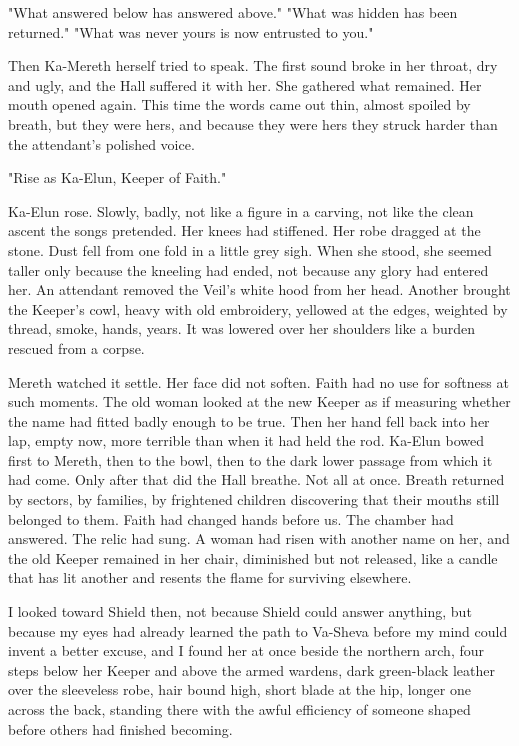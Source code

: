 "What answered below has answered above."
"What was hidden has been returned."
"What was never yours is now entrusted to you."

Then Ka-Mereth herself tried to speak. 
The first sound broke in her throat, dry and ugly, and the Hall suffered it with her. 
She gathered what remained. 
Her mouth opened again. 
This time the words came out thin, almost spoiled by breath, but they were hers, and because they were hers they struck harder than the attendant’s polished voice.

"Rise as Ka-Elun, Keeper of Faith." \par

Ka-Elun rose.
Slowly, badly, not like a figure in a carving, not like the clean ascent the songs pretended. 
Her knees had stiffened. 
Her robe dragged at the stone. 
Dust fell from one fold in a little grey sigh. 
When she stood, she seemed taller only because the kneeling had ended, not because any glory had entered her. 
An attendant removed the Veil’s white hood from her head. 
Another brought the Keeper’s cowl, heavy with old embroidery, yellowed at the edges, weighted by thread, smoke, hands, years. 
It was lowered over her shoulders like a burden rescued from a corpse. \par

Mereth watched it settle.
Her face did not soften. Faith had no use for softness at such moments. 
The old woman looked at the new Keeper as if measuring whether the name had fitted badly enough to be true. 
Then her hand fell back into her lap, empty now, more terrible than when it had held the rod.
Ka-Elun bowed first to Mereth, then to the bowl, then to the dark lower passage from which it had come.
Only after that did the Hall breathe.
Not all at once. 
Breath returned by sectors, by families, by frightened children discovering that their mouths still belonged to them. 
Faith had changed hands before us. 
The chamber had answered. 
The relic had sung. 
A woman had risen with another name on her, and the old Keeper remained in her chair, diminished but not released, 
like a candle that has lit another and resents the flame for surviving elsewhere.\par



I looked toward Shield then, not because Shield could answer anything, but because my eyes had already learned 
the path to Va-Sheva before my mind could invent a better excuse, and I found her at once beside the northern 
arch, four steps below her Keeper and above the armed wardens, dark green-black leather over the sleeveless 
robe, hair bound high, short blade at the hip, longer one across the back, standing there with the awful 
efficiency of someone shaped before others had finished becoming.\par


